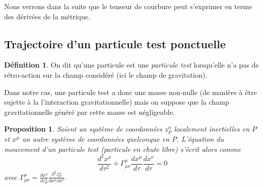 \documentclass[a4paper,11pt]{report}
\theoremstyle{definition}
\theoremstyle{plain}
\newtheorem{prop}[thm]{Proposition}
\theoremstyle{definition}
\newtheorem{defn}{Définition}[chapter]
\theoremstyle{remark}
\newcommand{\p}{\partial}
\begin{document}
            Nous verrons dans la suite que le tenseur de courbure peut s'exprimer en terme des dérivées de la métrique.
    
        \subsection{Trajectoire d'un particule test ponctuelle}
        
            \begin{defn}
                On dit qu'une particule est une \textit{particule test} lorsqu'elle n'a pas de rétro-action sur la champ considéré (ici le champ de gravitation).
            \end{defn}
            
            Dans notre cas, une particule test a donc une masse non-nulle (de manière à être sujette à la l'interaction gravitationnelle) mais on suppose que la champ gravitationnelle généré par cette masse est négligeable.
            
            \begin{prop}
                Soient un système de coordonnées $z^\alpha_P$ localement inertielles en $P$ et $x^\mu$ un autre système de coordonnées quelconque en $P$. L'équation du mouvement d'un particule test (particule en chute libre) s'écrit alors comme
                \begin{equation}
                    \frac{d^2x^\rho}{d\tau^2}+\Gamma^\rho_{\mu\nu}\frac{dx^\mu}{d\tau}\frac{dx^\nu}{d\tau} = 0
                \end{equation}
                avec $\Gamma^\rho_{\mu\nu} = \frac{\p x^\rho}{\p z^\alpha_P}\frac{\p^2 z^\alpha_P}{\p x^\mu\p x^\nu}$.
            \end{prop}
            
\end{document}

